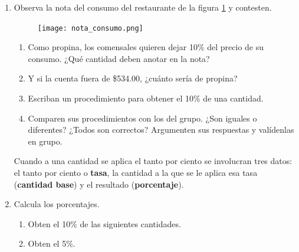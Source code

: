 \documentclass[11pt]{book}
\begin{document}
\begin{enumerate}
  \item Observa la nota del consumo del restaurante de la figura \ref{fig:nota_consumo} y
        contesten.

        \begin{minipage}[t]{0.2\textwidth}
          \begin{figure}[H]
            \centering
            \texttt{[image: nota\_consumo.png]}
            \label{fig:nota_consumo}
          \end{figure}
        \end{minipage}\hfill
        \begin{minipage}[t]{0.75\textwidth}
          \begin{enumerate}
            \item Como propina, los comensales quieren dejar 10\% del precio de su consumo. ¿Qué cantidad deben anotar en la nota?\\
            \item Y si la cuenta fuera de \$534.00, ¿cuánto sería de propina?\\
            \item Escriban un procedimiento para obtener el 10\% de una cantidad.\\
            \item Comparen sus procedimientos con los del grupo. ¿Son iguales o diferentes? ¿Todos son correctos? Argumenten sus respuestas y valídenlas en grupo.\\
          \end{enumerate}
        \end{minipage}

        \begin{boxH}
          Cuando a una cantidad se aplica el tanto por ciento se involucran tres
          datos: el tanto por ciento o \textbf{tasa}, la cantidad a la que se le aplica esa tasa
          (\textbf{cantidad base}) y el resultado (\textbf{porcentaje}).
        \end{boxH}
  \item Calcula los porcentajes.
        \begin{enumerate}
          \item Obten el 10\% de las siguientes cantidades.\\

          \item Obten el 5\%.\\


\end{enumerate}
\end{enumerate}
\end{document}
